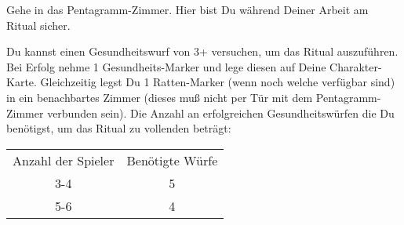   \begin{itemize}
        \bitem Gehe in das Pentagramm-Zimmer. Hier bist Du während Deiner Arbeit am Ritual sicher.

        \bitem Du kannst einen Gesundheitswurf von 3+ versuchen, um das Ritual auszuführen. Bei Erfolg nehme 1 Gesundheits-Marker und lege diesen auf Deine Charakter-Karte. Gleichzeitig legst Du 1 Ratten-Marker (wenn noch welche verfügbar sind) in ein benachbartes Zimmer (dieses muß nicht per Tür mit dem Pentagramm-Zimmer verbunden sein). Die Anzahl an erfolgreichen Gesundheitswürfen die Du benötigst, um das Ritual zu vollenden beträgt:

        \begin{tabular}{cc}
            Anzahl der Spieler & Benötigte Würfe \\
            3-4 & 5 \\
            5-6 & 4 \\
        \end{tabular}
    \end{itemize}

